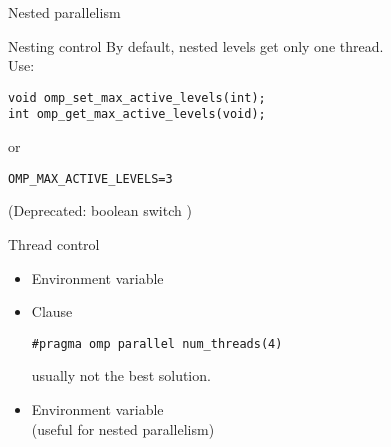 \begin{numberedframe}{Nested parallelism}
  
\end{numberedframe}

\begin{numberedframe}{Nesting control}
  By default, nested levels get only one thread.\\
  Use:
\begin{lstlisting}
void omp_set_max_active_levels(int);
int omp_get_max_active_levels(void);
\end{lstlisting}
or 
\begin{verbatim}
OMP_MAX_ACTIVE_LEVELS=3
\end{verbatim}
(Deprecated: boolean switch )
\end{numberedframe}

\begin{numberedframe}{Thread control}
  \begin{itemize}
  \item Environment variable 
  \item Clause \\
\begin{lstlisting}
#pragma omp parallel num_threads(4)
\end{lstlisting}
    usually not the best solution.
  \item Environment variable \\
    (useful for nested parallelism)
  \end{itemize}
\end{numberedframe}

\endinput

\begin{numberedframe}{}
\begin{lstlisting}
\end{lstlisting}
\begin{itemize}
\item
\end{itemize}
\end{numberedframe}

